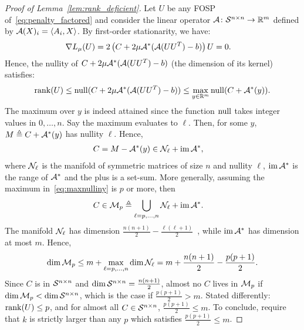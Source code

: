 \begin{proof}[Proof of Lemma~\ref{lem:rank_deficient}]
	Let $U$ be any FOSP of~\eqref{eq:penalty_factored} and consider the linear operator $\mathcal{A} \colon \mathcal{S}^{n\times n} \to \mathbb{R}^{m}$ defined by $\mathcal{A}(X)_i = \left\langle A_i, X \right\rangle$. By first-order stationarity, we have: 
	\begin{align*}
		\nabla L_\mu(U) & = 2\left( C + 2\mu \mathcal{A}^*(\mathcal{A}(UU^T) - b) \right)U = 0.
	\end{align*}
	Hence, the nullity of $C + 2\mu \mathcal{A}^*(\mathcal{A}(UU^T) - b)$ (the dimension of its kernel) satisfies:
	\begin{align}
		\operatorname{rank}(U) \leq \operatorname{null}(C + 2\mu \mathcal{A}^*(\mathcal{A}(UU^T) - b)) \leq \max_{y \in \mathbb{R}^{m}} \operatorname{null}(C + \mathcal{A}^*(y)).
		\label{eq:maxnulliny}
	\end{align}
	The maximum over $y$ is indeed attained since the function $\operatorname{null}$ takes integer values in $0, \ldots, n$. Say the maximum evaluates to $\ell$. Then, for some $y$, $M \triangleq C + \mathcal{A}^*(y)$ has nullity $\ell$. Hence,
	\begin{align*}
		C & = M - \mathcal{A}^*(y) \in \mathcal{N}_\ell + \operatorname{im} \mathcal{A}^*,
	\end{align*}
	where $\mathcal{N}_\ell$ is the manifold of symmetric matrices of size $n$ and nullity $\ell$, $\operatorname{im} \mathcal{A}^*$ is the range of $\mathcal{A}^*$ and the plus is a set-sum. More generally, assuming the maximum in~\eqref{eq:maxnulliny} is $p$ or more, then
	\begin{align*}
		C & \in \mathcal{M}_p \triangleq \bigcup_{\ell = p, \ldots, n} \mathcal{N}_\ell + \operatorname{im} \mathcal{A}^*.
	\end{align*}
	The manifold $\mathcal{N}_\ell$ has dimension $\frac{n(n+1)}{2} - \frac{\ell(\ell+1)}{2}$~\citep[Prop.~2.1(i)]{helmke1995matrixlsq}, while $\operatorname{im} \mathcal{A}^*$ has dimension at most $m$. Hence, $$\dim \mathcal{M}_p \leq m + \max_{\ell = p, \ldots, n} \dim \mathcal{N}_\ell = m + \frac{n(n+1)}{2} - \frac{p(p+1)}{2}.$$ Since $C$ is in $\mathcal{S}^{n\times n}$ and $\dim \mathcal{S}^{n\times n} = \frac{n(n+1)}{2}$, almost no $C$ lives in $\mathcal{M}_p$ if $\dim\mathcal{M}_p < \dim \mathcal{S}^{n\times n}$, which is the case if $\frac{p(p+1)}{2} > m$. Stated differently: $\operatorname{rank}(U) \leq p$, and for almost all $C \in \mathcal{S}^{n\times n}$, $\frac{p(p+1)}{2} \leq m$. To conclude, require that $k$ is strictly larger than any $p$ which satisfies $\frac{p(p+1)}{2} \leq m$.
\end{proof}

